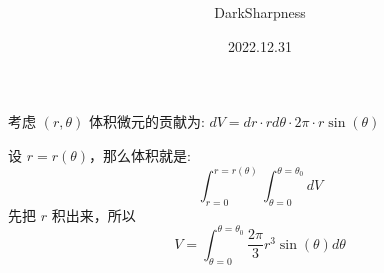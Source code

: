 \documentclass[fontset=windows]{article}
\title{\heiti\zihao{2} }
\author{DarkSharpness}
\date{2022.12.31}
\begin{document}
	\maketitle

考虑 $(r,\theta)$ 体积微元的贡献为: $dV = dr \cdot r d\theta \cdot 2\pi \cdot r\sin(\theta) $

设 $r = r(\theta)$，那么体积就是:
$$
\int_{r = 0}^{r = r(\theta)} \int_{\theta = 0}^{\theta = \theta_0} dV
$$
先把 $r$ 积出来，所以 $$V = \int_{\theta = 0}^{\theta = \theta_0} {\frac{2\pi}{3} r^3 \sin(\theta) d\theta} $$
\end{document}
